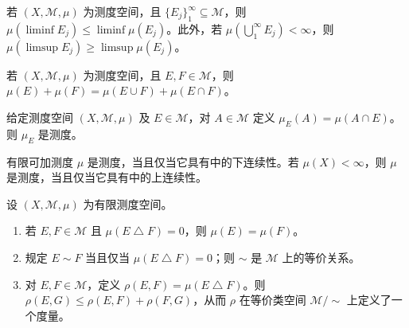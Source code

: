 \documentclass[../../main.tex]{subfiles}%
\begin{document}
\begin{exercise}\label{exercise:ch01-set-limits}
若 $(X,\mathscr{M},\mu)$ 为测度空间，且 $\{E_j\}_1^\infty\subseteq\mathscr{M}$，则 $\mu(\liminf E_j)\leqslant\liminf\mu(E_j)$。此外，若 $\mu(\bigcup_1^\infty E_j)<\infty$，则 $\mu(\limsup E_j)\geqslant\limsup\mu(E_j)$。
\end{exercise}

\begin{exercise}\label{exercise:ch01-inclusion-exclusion}
若 $(X,\mathscr{M},\mu)$ 为测度空间，且 $E,F\in\mathscr{M}$，则 $\mu(E)+\mu(F)=\mu(E\cup F)+\mu(E\cap F)$。
\end{exercise}

\begin{exercise}\label{exercise:ch01-restriction}
给定测度空间 $(X,\mathscr{M},\mu)$ 及 $E\in\mathscr{M}$，对 $A\in\mathscr{M}$ 定义 $\mu_E(A)=\mu(A\cap E)$。则 $\mu_E$ 是测度。
\end{exercise}

\begin{exercise}\label{exercise:ch01-continuity-additivity}
有限可加测度 $\mu$ 是测度，当且仅当它具有中的下连续性。若 $\mu(X)<\infty$，则 $\mu$ 是测度，当且仅当它具有中的上连续性。
\end{exercise}

\begin{exercise}\label{exercise:ch01-measure-algebra-metric}
设 $(X,\mathscr{M},\mu)$ 为有限测度空间。
\begin{enumerate}[label=\alph*.,ref=(\alph*)]
\item\label{item:ch01-symmetric-difference-zero} 若 $E,F\in\mathscr{M}$ 且 $\mu(E\mathbin{\triangle}F)=0$，则 $\mu(E)=\mu(F)$。
\item\label{item:ch01-symmetric-difference-equivalence} 规定 $E\sim F$ 当且仅当 $\mu(E\mathbin{\triangle}F)=0$；则 $\sim$ 是 $\mathscr{M}$ 上的等价关系。
\item\label{item:ch01-symmetric-difference-metric} 对 $E,F\in\mathscr{M}$，定义 $\rho(E,F)=\mu(E\mathbin{\triangle}F)$。则 $\rho(E,G)\leqslant\rho(E,F)+\rho(F,G)$，从而 $\rho$ 在等价类空间 $\mathscr{M}/{\sim}$ 上定义了一个度量。
\end{enumerate}
\end{exercise}
\end{document}
